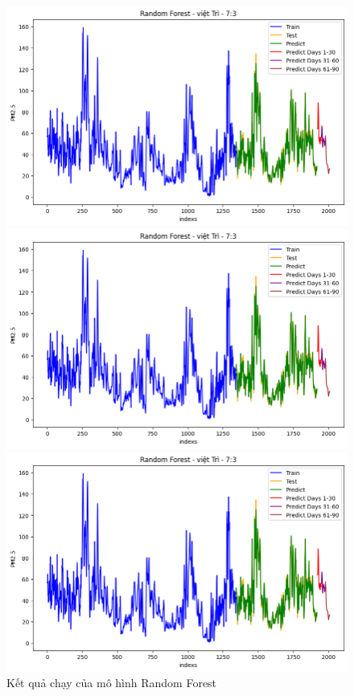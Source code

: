 \begin{figure}[H]
    \begin{minipage}{0.15\textwidth}
    \centering
    \includegraphics[width=1\textwidth]{img/final/RF/90D/RF_7_3_VT.png}
    \end{minipage}
    \hfill
    \begin{minipage}{0.15\textwidth}
    \centering
    \includegraphics[width=1\textwidth]{img/final/RF/90D/RF_7_3_VT.png}
    \end{minipage}
    \hfill
    \begin{minipage}{0.15\textwidth}
    \centering
    \includegraphics[width=1\textwidth]{img/final/RF/90D/RF_7_3_VT.png}
    \end{minipage}
    \hfill
    
    \caption{Kết quả chạy của mô hình Random Forest}
    \label{fig:Random_Forest}
\end{figure}
